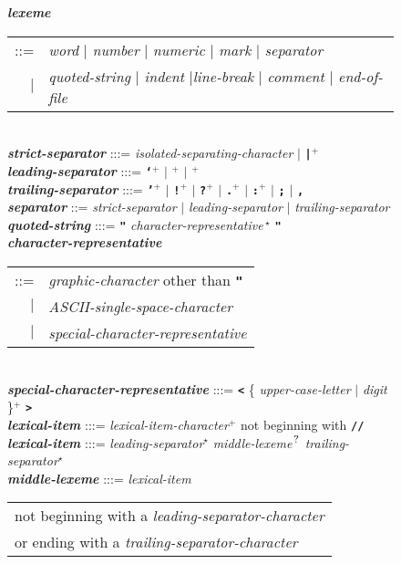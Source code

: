 \documentclass[12pt]{article}
\newcommand{\TT}[1]{{\tt \bfseries #1}}
\newcommand{\emkey}[1]{{\em \bfseries #1}}
\newcommand{\STAR}{{\Large $^\star$}}
\newcommand{\PLUS}[1][]{{$^{+#1}$}}
\newcommand{\QMARK}{{$^{\,\mbox{\footnotesize ?}}$}}
\newlength{\figurewidth}
\newenvironment{boxedfigure}[1][!btp]%
	{\begin{figure*}[#1]
	 \begin{lrbox}{\figurebox}
	 \begin{minipage}{\figurewidth}

	 \vspace*{1ex}}%
	{
	 \vspace*{1ex}

	 \end{minipage}
	 \end{lrbox}
	 \begin{center}
	 \fbox{\hspace*{0.1in}\usebox{\figurebox}\hspace*{0.1in}}
	 \end{center}
	 \end{figure*}}
\newenvironment{indpar}[1][0.3in]%
	{\begin{list}{}%
		     {\setlength{\itemsep}{0in}%
		      \setlength{\topsep}{0in}%
		      \setlength{\parsep}{1ex}%
		      \setlength{\labelwidth}{#1}%
		      \setlength{\leftmargin}{#1}%
		      \addtolength{\leftmargin}{\labelsep}}%
	 \item}%
	{\end{list}}
\begin{document}
\begin{boxedfigure}[!p]
\begin{indpar}
\emkey{lexeme}
        \begin{tabular}[t]{rl}
	::= & {\em word} $|$
	      {\em number} $|$ {\em numeric} $|$
	      {\em mark} $|$ {\em separator} \\
	$|$ & {\em quoted-string} $|$ {\em indent} $|${\em line-break} $|$
	      {\em comment} $|$ {\em end-of-file}
	\end{tabular}
\label{LEXEME}
\\[0.5ex]
\emkey{strict-separator} :::= {\em isolated-separating-character} $|$
                              \TT{|}\PLUS{}
\\
\emkey{leading-separator} :::=
	\TT{`}\PLUS{} $|$ 
	\TT{\textexclamdown}\PLUS{} $|$ \TT{\textquestiondown}\PLUS{}
\\
\emkey{trailing-separator} :::= \TT{'}\PLUS{} $|$
				   \TT{!}\PLUS{} $|$
				   \TT{?}\PLUS{} $|$
				   \TT{.}\PLUS{} $|$
				   \TT{:}\PLUS{} $|$
				   \TT{;} $|$
				   \TT{,}
\\
\emkey{separator}
    ::= {\em strict-separator} 
    $|$ {\em leading-separator}
    $|$ {\em trailing-separator}
\\[0.3ex]
\emkey{quoted-string} :::=
    \TT{"} {\em character-representative}\,\STAR{} \TT{"}
\\
\emkey{character-representative}
	\begin{tabular}[t]{@{}rl@{}}
	::= & {\em graphic-character} other than \TT{"} \\
	$|$ & {\em ASCII-single-space-character} \\
	$|$ & {\em special-character-representative} \\
	\end{tabular}
\\
\emkey{special-character-representative} :::=
    \TT{<} \{ {\em upper-case-letter} $|$ {\em digit} \}\PLUS{} \TT{>}
\\[0.3ex]
\emkey{lexical-item} :::= {\em lexical-item-character}\PLUS{}
                       not beginning with \TT{//}
\\
\emkey{lexical-item} :::= {\em leading-separator}\STAR{}
			  {\em middle-lexeme}\QMARK{}
                          {\em trailing-separator}\STAR{}
\\
\emkey{middle-lexeme} :::= 
	{\em lexical-item}
	\begin{tabular}[t]{@{}l@{}}
	not beginning with a {\em leading-separator-character} \\
	or ending with a {\em trailing-separator-character} \\
	\end{tabular}

\end{indpar}
\end{boxedfigure}
\end{document}
